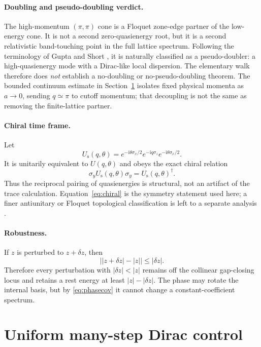 \documentclass[11pt]{article}
\newcommand{\ii}{\mathrm{i}}
\begin{document}
\paragraph{Doubling and pseudo-doubling verdict.}
The high-momentum $(\pi,\pi)$ cone is a Floquet zone-edge partner of the
low-energy cone.  It is not a second zero-quasienergy root, but it is a second
relativistic band-touching point in the full lattice spectrum.  Following the
terminology of Gupta and Short \cite{GuptaShortDoubling}, it is naturally
classified as a pseudo-doubler: a high-quasienergy mode with a Dirac-like local
dispersion.  The elementary walk therefore does \emph{not} establish a
no-doubling or no-pseudo-doubling theorem.  The bounded
continuum estimate in Section~\ref{sec:continuum} isolates fixed physical
momenta as $a\to0$, sending $q\simeq\pi$ to cutoff momentum; that decoupling is
not the same as removing the finite-lattice partner.

\paragraph{Chiral time frame.}
Let
\[
 U_{\mathrm s}(q,\theta)
 =e^{-\ii\theta\sigma_x/2}
  e^{-\ii q\sigma_z}
  e^{-\ii\theta\sigma_x/2}.
\]
It is unitarily equivalent to $U(q,\theta)$ and obeys the exact chiral relation
\begin{equation}\label{eq:chiral}
 \sigma_yU_{\mathrm s}(q,\theta)\sigma_y
 =U_{\mathrm s}(q,\theta)^\dagger.
\end{equation}
Thus the reciprocal pairing of quasienergies is structural, not an artifact of
the trace calculation.  Equation~\eqref{eq:chiral} is the symmetry statement
used here; a finer antiunitary or Floquet topological classification is left to
a separate analysis \cite{AsbothObuse}.

\paragraph{Robustness.}
If $z$ is perturbed to $z+\delta z$, then
\[
 \bigl||z+\delta z|-|z|\bigr|\leq|\delta z|.
\]
Therefore every perturbation with $|\delta z|<|z|$ remains off the collinear
gap-closing locus and retains a rest energy at least
$|z|-|\delta z|$.  The phase may rotate the internal basis, but by
\eqref{eq:phasecov} it cannot change a constant-coefficient spectrum.

\section{Uniform many-step Dirac control}
\label{sec:continuum}
\end{document}
